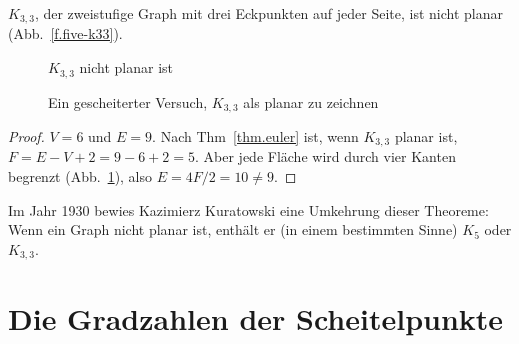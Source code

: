 \begin{theorem}
$K_{3,3}$, der zweistufige Graph mit drei Eckpunkten auf jeder Seite, ist nicht planar (Abb.~\ref{f.five-k33}).
\end{theorem}

\begin{figure}[b]
\begin{minipage}{.45\textwidth}
\begin{center}
\caption{$K_{3,3}$ nicht planar ist}\label{f.five-k33}
\end{center}
\end{minipage}
\hfill
\begin{minipage}{.45\textwidth}
\begin{center}
\caption{Ein gescheiterter Versuch, $K_{3,3}$ als planar zu zeichnen}\label{f.five-k33-failed}
\end{center}
\end{minipage}
\end{figure}

\begin{proof}
$V=6$ und $E=9$. Nach Thm~\ref{thm.euler} ist, wenn $K_{3,3}$ planar ist, $F=E-V+2=9-6+2=5$. Aber jede Fläche wird durch vier Kanten begrenzt (Abb.~\ref{f.five-k33-failed}), also $E=4F/2=10\neq 9$.
\end{proof}

Im Jahr 1930 bewies Kazimierz Kuratowski eine Umkehrung dieser Theoreme: Wenn ein Graph nicht planar ist, enthält er (in einem bestimmten Sinne) $K_5$ oder $K_{3,3}$.

\section{Die Gradzahlen der Scheitelpunkte}\label{s.degrees}

